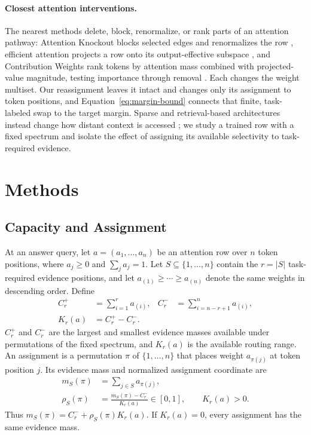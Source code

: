 \documentclass{article}
\begin{document}
\paragraph{Closest attention interventions.}
The nearest methods delete, block, renormalize, or rank parts of an attention pathway: Attention Knockout
blocks selected edges and renormalizes the row \citep{geva2023dissecting}, efficient attention projects a row
onto its output-effective subspace \citep{naim2024explaining}, and Contribution Weights rank tokens by
attention mass combined with projected-value magnitude, testing importance through removal
\citep{cunningham2026contribution}. Each changes the weight multiset. Our reassignment leaves it intact and
changes only its assignment to token positions, and Equation~\ref{eq:margin-bound} connects that finite,
task-labeled swap to the target margin. Sparse and retrieval-based architectures instead change how distant
context is accessed \citep{sparselong,hu2025causalretrieval}; we study a trained row with a fixed spectrum and
isolate the effect of assigning its available selectivity to task-required evidence.

\section{Methods}

\subsection{Capacity and Assignment}

At an answer query, let $a=(a_1,\ldots,a_n)$ be an attention row over $n$ token positions, where $a_j\ge0$
and $\sum_j a_j=1$. Let $S\subseteq\{1,\ldots,n\}$ contain the $r=|S|$ task-required evidence positions,
and let $a_{(1)}\ge\cdots\ge a_{(n)}$ denote the same weights in descending order. Define
\begin{equation}
\begin{aligned}
 C_r^+&=\sum_{i=1}^{r}a_{(i)}, &
 C_r^-&=\sum_{i=n-r+1}^{n}a_{(i)},\\
 K_r(a)&=C_r^+-C_r^-.
\end{aligned}
\label{eq:capacity}
\end{equation}
$C_r^+$ and $C_r^-$ are the largest and smallest evidence masses available under permutations of the fixed
spectrum, and $K_r(a)$ is the available routing range. An assignment is a permutation $\pi$ of
$\{1,\ldots,n\}$ that places weight $a_{\pi(j)}$ at token position $j$. Its evidence mass and normalized
assignment coordinate are
\begin{equation}
\begin{aligned}
 m_S(\pi)&=\sum_{j\in S}a_{\pi(j)},\\
 \rho_S(\pi)&=\frac{m_S(\pi)-C_r^-}{K_r(a)}\in[0,1],\qquad K_r(a)>0.
\end{aligned}
\label{eq:assignment-coordinate}
\end{equation}
Thus $m_S(\pi)=C_r^-+\rho_S(\pi)K_r(a)$. If $K_r(a)=0$, every assignment has the same evidence mass.
\end{document}
